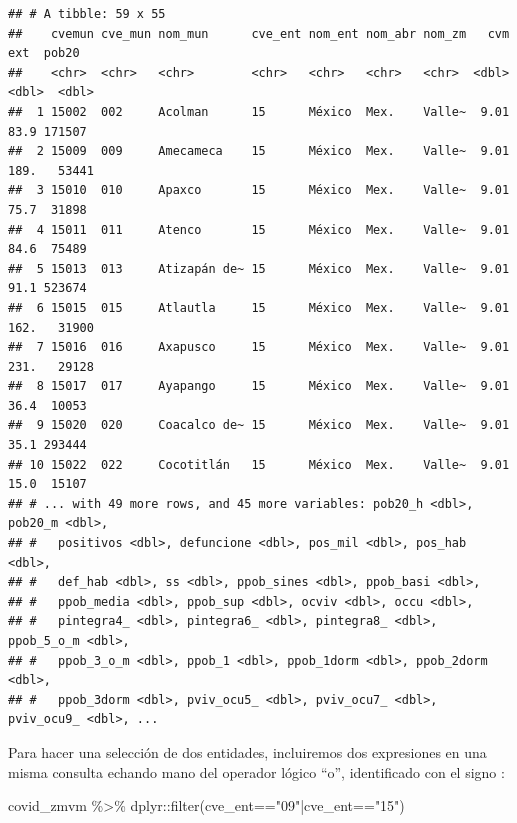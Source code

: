 \documentclass[
  11pt,
  oneside]{book}
\newenvironment{Shaded}{\begin{snugshade}}{\end{snugshade}}
\newcommand{\FunctionTok}[1]{\textcolor[rgb]{0.00,0.00,0.00}{#1}}
\newcommand{\NormalTok}[1]{#1}
\newcommand{\SpecialCharTok}[1]{\textcolor[rgb]{0.00,0.00,0.00}{#1}}
\newcommand{\StringTok}[1]{\textcolor[rgb]{0.31,0.60,0.02}{#1}}
\begin{document}
\begin{verbatim}
## # A tibble: 59 x 55
##    cvemun cve_mun nom_mun      cve_ent nom_ent nom_abr nom_zm   cvm   ext  pob20
##    <chr>  <chr>   <chr>        <chr>   <chr>   <chr>   <chr>  <dbl> <dbl>  <dbl>
##  1 15002  002     Acolman      15      México  Mex.    Valle~  9.01  83.9 171507
##  2 15009  009     Amecameca    15      México  Mex.    Valle~  9.01 189.   53441
##  3 15010  010     Apaxco       15      México  Mex.    Valle~  9.01  75.7  31898
##  4 15011  011     Atenco       15      México  Mex.    Valle~  9.01  84.6  75489
##  5 15013  013     Atizapán de~ 15      México  Mex.    Valle~  9.01  91.1 523674
##  6 15015  015     Atlautla     15      México  Mex.    Valle~  9.01 162.   31900
##  7 15016  016     Axapusco     15      México  Mex.    Valle~  9.01 231.   29128
##  8 15017  017     Ayapango     15      México  Mex.    Valle~  9.01  36.4  10053
##  9 15020  020     Coacalco de~ 15      México  Mex.    Valle~  9.01  35.1 293444
## 10 15022  022     Cocotitlán   15      México  Mex.    Valle~  9.01  15.0  15107
## # ... with 49 more rows, and 45 more variables: pob20_h <dbl>, pob20_m <dbl>,
## #   positivos <dbl>, defuncione <dbl>, pos_mil <dbl>, pos_hab <dbl>,
## #   def_hab <dbl>, ss <dbl>, ppob_sines <dbl>, ppob_basi <dbl>,
## #   ppob_media <dbl>, ppob_sup <dbl>, ocviv <dbl>, occu <dbl>,
## #   pintegra4_ <dbl>, pintegra6_ <dbl>, pintegra8_ <dbl>, ppob_5_o_m <dbl>,
## #   ppob_3_o_m <dbl>, ppob_1 <dbl>, ppob_1dorm <dbl>, ppob_2dorm <dbl>,
## #   ppob_3dorm <dbl>, pviv_ocu5_ <dbl>, pviv_ocu7_ <dbl>, pviv_ocu9_ <dbl>, ...
\end{verbatim}

Para hacer una selección de dos entidades, incluiremos dos expresiones en una misma consulta echando mano del operador lógico ``o'', identificado con el signo \texttt{\textbar{}}:

\begin{Shaded}
\begin{Highlighting}[]
\NormalTok{covid\_zmvm }\SpecialCharTok{\%\textgreater{}\%}\NormalTok{ dplyr}\SpecialCharTok{::}\FunctionTok{filter}\NormalTok{(cve\_ent}\SpecialCharTok{==}\StringTok{"09"}\SpecialCharTok{|}\NormalTok{cve\_ent}\SpecialCharTok{==}\StringTok{"15"}\NormalTok{)}
\end{Highlighting}
\end{Shaded}
\end{document}
